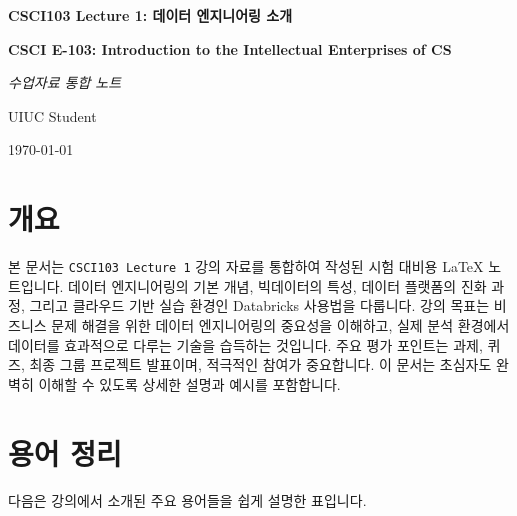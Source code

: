 \documentclass[11pt,a4paper]{article}
\begin{document}
\begin{titlepage}
    \centering
    \vspace*{1cm}
    {\Huge\bfseries CSCI103 Lecture 1: 데이터 엔지니어링 소개\par}
    \vspace{1.5cm}
    {\Large\bfseries CSCI E-103: Introduction to the Intellectual Enterprises of CS\par}
    \vspace{2cm}
    {\Large\itshape 수업자료 통합 노트\par}
    \vfill
    {\large UIUC Student\par}
    \vspace{1cm}
    {\large \today\par}
\end{titlepage}

\newpage

\section*{개요}
본 문서는 \texttt{CSCI103 Lecture 1} 강의 자료를 통합하여 작성된 시험 대비용 LaTeX 노트입니다.
데이터 엔지니어링의 기본 개념, 빅데이터의 특성, 데이터 플랫폼의 진화 과정, 그리고 클라우드 기반 실습 환경인 Databricks 사용법을 다룹니다.
강의 목표는 비즈니스 문제 해결을 위한 데이터 엔지니어링의 중요성을 이해하고, 실제 분석 환경에서 데이터를 효과적으로 다루는 기술을 습득하는 것입니다.
주요 평가 포인트는 과제, 퀴즈, 최종 그룹 프로젝트 발표이며, 적극적인 참여가 중요합니다.
이 문서는 초심자도 완벽히 이해할 수 있도록 상세한 설명과 예시를 포함합니다.

\newpage

\section*{용어 정리}
다음은 강의에서 소개된 주요 용어들을 쉽게 설명한 표입니다.
\end{document}

